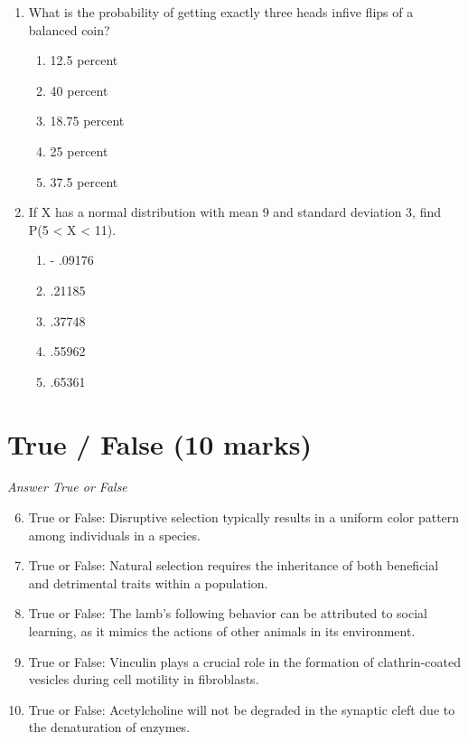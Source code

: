 \documentclass[12pt]{article}
\begin{document}
\begin{enumerate}[label=\arabic*.]
\begin{enumerate}[label=(\alph*)]
\end{enumerate}
\item What is the probability of getting exactly three heads infive flips of a balanced coin?
\begin{enumerate}[label=(\alph*)]
    \item 12.5 percent
    \item 40 percent
    \item 18.75 percent
    \item 25 percent
    \item 37.5 percent
\end{enumerate}
\item If X has a normal distribution with mean 9 and standard deviation 3, find P(5 \textless{} X \textless{} 11).
\begin{enumerate}[label=(\alph*)]
    \item - .09176
    \item .21185
    \item .37748
    \item .55962
    \item .65361
\end{enumerate}
\end{enumerate}

\section*{True / False (10 marks)}
\textit{Answer True or False}
\begin{enumerate}[label=\arabic*.]
\setcounter{enumi}{5}
\item True or False: Disruptive selection typically results in a uniform color pattern among individuals in a species.
\item True or False: Natural selection requires the inheritance of both beneficial and detrimental traits within a population.
\item True or False: The lamb's following behavior can be attributed to social learning, as it mimics the actions of other animals in its environment.
\item True or False: Vinculin plays a crucial role in the formation of clathrin-coated vesicles during cell motility in fibroblasts.
\item True or False: Acetylcholine will not be degraded in the synaptic cleft due to the denaturation of enzymes.
\end{enumerate}
\end{document}
